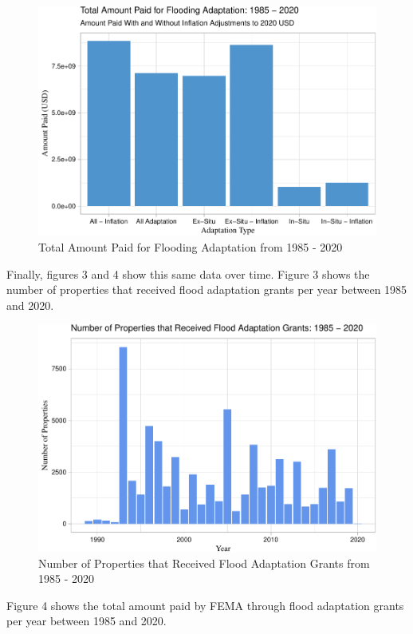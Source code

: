 \documentclass[
  12pt,
]{article}
\begin{document}
\begin{figure}
\centering
\includegraphics{finalreport_files/figure-latex/unnamed-chunk-7-1.pdf}
\caption{Total Amount Paid for Flooding Adaptation from 1985 - 2020}
\end{figure}

Finally, figures 3 and 4 show this same data over time. Figure 3 shows
the number of properties that received flood adaptation grants per year
between 1985 and 2020.

\begin{figure}
\centering
\includegraphics{finalreport_files/figure-latex/unnamed-chunk-8-1.pdf}
\caption{Number of Properties that Received Flood Adaptation Grants from
1985 - 2020}
\end{figure}

\newpage

Figure 4 shows the total amount paid by FEMA through flood adaptation
grants per year between 1985 and 2020. \newline
\end{document}
